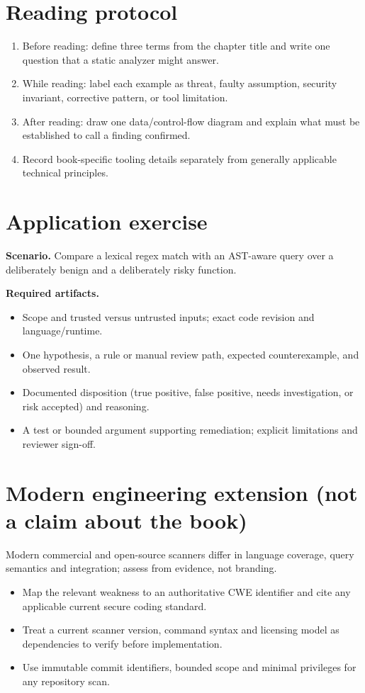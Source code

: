 \documentclass[10pt,letterpaper]{article}
\begin{document}
\section{Reading protocol}
\begin{enumerate}
\item Before reading: define three terms from the chapter title and write one question that a static analyzer might answer.
\item While reading: label each example as threat, faulty assumption, security invariant, corrective pattern, or tool limitation.
\item After reading: draw one data/control-flow diagram and explain what must be established to call a finding confirmed.
\item Record book-specific tooling details separately from generally applicable technical principles.
\end{enumerate}

\section{Application exercise}
\textbf{Scenario.} Compare a lexical regex match with an AST-aware query over a deliberately benign and a deliberately risky function.

\textbf{Required artifacts.}\begin{itemize}
\item Scope and trusted versus untrusted inputs; exact code revision and language/runtime.
\item One hypothesis, a rule or manual review path, expected counterexample, and observed result.
\item Documented disposition (true positive, false positive, needs investigation, or risk accepted) and reasoning.
\item A test or bounded argument supporting remediation; explicit limitations and reviewer sign-off.
\end{itemize}

\section{Modern engineering extension (not a claim about the book)}
Modern commercial and open-source scanners differ in language coverage, query semantics and integration; assess from evidence, not branding.

\begin{itemize}
\item Map the relevant weakness to an authoritative CWE identifier and cite any applicable current secure coding standard.
\item Treat a current scanner version, command syntax and licensing model as dependencies to verify before implementation.
\item Use immutable commit identifiers, bounded scope and minimal privileges for any repository scan.
\end{itemize}
\end{document}
